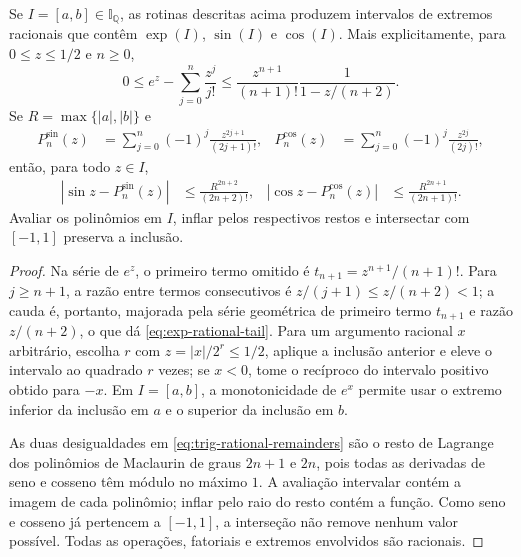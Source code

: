 \begin{lemma}
\label{lem:rational-transcendental-enclosures}
Se $I=[a,b]\in\mathbb I_{\mathbb Q}$, as rotinas descritas acima produzem
intervalos de extremos racionais que contêm $\exp(I)$, $\sin(I)$ e $\cos(I)$.
Mais explicitamente, para $0\le z\le1/2$ e $n\ge0$,
\begin{equation}
 0\le e^z-\sum_{j=0}^{n}\frac{z^j}{j!}
 \le
 \frac{z^{n+1}}{(n+1)!}
 \frac{1}{1-z/(n+2)}.
 \label{eq:exp-rational-tail}
\end{equation}
Se $R=\max\{|a|,|b|\}$ e
\begin{align*}
 P_n^{\sin}(z)&=\sum_{j=0}^{n}(-1)^j\frac{z^{2j+1}}{(2j+1)!},&
 P_n^{\cos}(z)&=\sum_{j=0}^{n}(-1)^j\frac{z^{2j}}{(2j)!},
\end{align*}
então, para todo $z\in I$,
\begin{align}
 |\sin z-P_n^{\sin}(z)|
 &\le \frac{R^{2n+2}}{(2n+2)!},
 &
 |\cos z-P_n^{\cos}(z)|
 &\le \frac{R^{2n+1}}{(2n+1)!}.
 \label{eq:trig-rational-remainders}
\end{align}
Avaliar os polinômios em $I$, inflar pelos respectivos restos e intersectar
com $[-1,1]$ preserva a inclusão.
\end{lemma}

\begin{proof}
Na série de $e^z$, o primeiro termo omitido é
$t_{n+1}=z^{n+1}/(n+1)!$. Para $j\ge n+1$, a razão entre termos consecutivos
é $z/(j+1)\le z/(n+2)<1$; a cauda é, portanto, majorada pela série geométrica
de primeiro termo $t_{n+1}$ e razão $z/(n+2)$, o que dá
\eqref{eq:exp-rational-tail}. Para um argumento racional $x$ arbitrário,
escolha $r$ com $z=|x|/2^r\le1/2$, aplique a inclusão anterior e eleve o
intervalo ao quadrado $r$ vezes; se $x<0$, tome o recíproco do intervalo
positivo obtido para $-x$. Em $I=[a,b]$, a monotonicidade de $e^x$ permite
usar o extremo inferior da inclusão em $a$ e o superior da inclusão em $b$.

As duas desigualdades em \eqref{eq:trig-rational-remainders} são o resto de
Lagrange dos polinômios de Maclaurin de graus $2n+1$ e $2n$, pois todas as
derivadas de seno e cosseno têm módulo no máximo $1$. A avaliação intervalar
contém a imagem de cada polinômio; inflar pelo raio do resto contém a função.
Como seno e cosseno já pertencem a $[-1,1]$, a interseção não remove nenhum
valor possível. Todas as operações, fatoriais e extremos envolvidos são
racionais.
\end{proof}

